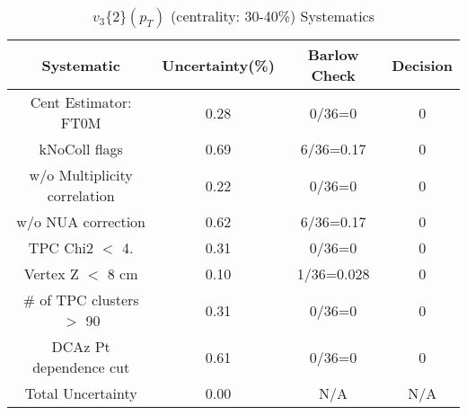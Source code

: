 \begin{table}[htbp]
\caption{$v_3\{2\}(p_{T})$ (centrality: 30-40\%) Systematics}
\label{tab:Sys_pTDiffv3}
\centering
\begin{tabular}{|c|c|c|c|}
\hline
Systematic & Uncertainty(\%) & Barlow Check & Decision \\
\hline
Cent Estimator: FT0M & 0.28 & 0/36=0 & 0 \\
kNoColl flags & 0.69 & 6/36=0.17 & 0 \\
w/o Multiplicity correlation & 0.22 & 0/36=0 & 0 \\
w/o NUA correction & 0.62 & 6/36=0.17 & 0 \\
TPC Chi2 $<$ 4. & 0.31 & 0/36=0 & 0 \\
Vertex Z $<$ 8 cm & 0.10 & 1/36=0.028 & 0 \\
\# of TPC clusters $>$ 90 & 0.31 & 0/36=0 & 0 \\
DCAz Pt dependence cut & 0.61 & 0/36=0 & 0 \\
\hline
Total Uncertainty & 0.00 & N/A & N/A \\
\hline
\end{tabular}
\end{table}
